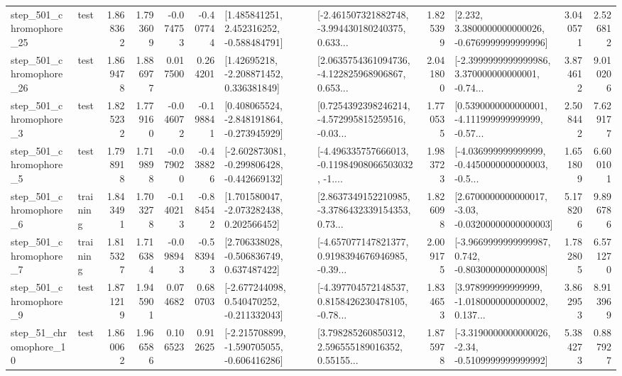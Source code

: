 \begin{tabular}{llrrrrllrlrr}
  step\_501\_chromophore\_25 &      test &      1.868362 &    1.793609 &     -0.074753 & -0.407744 &    [1.485841251, 2.452316252, -0.588484791] &  [-2.461507321882748, -3.994430180240375, 0.633... &       1.825399 &   [2.232, 3.3800000000000026, -0.6769999999999996] &            3.040571 &          2.526812 \\
  step\_501\_chromophore\_26 &      test &      1.869478 &    1.886977 &      0.017500 &  0.264201 &     [1.42695218, -2.208871452, 0.336381849] &  [2.0635754361094736, -4.122825968906867, 0.653... &       2.041800 &  [-2.3999999999999986, 3.370000000000001, -0.74... &            3.874612 &          9.010206 \\
   step\_501\_chromophore\_3 &      test &      1.825232 &    1.779160 &     -0.046072 & -0.198841 &   [0.408065524, -2.848191864, -0.273945929] &  [0.7254392398246214, -4.572995815259516, -0.03... &       1.770535 &  [0.5390000000000001, -4.111999999999999, -0.57... &            2.508442 &          7.629177 \\
   step\_501\_chromophore\_5 &      test &      1.798918 &    1.719898 &     -0.079020 & -0.438826 &  [-2.602873081, -0.299806428, -0.442669132] &  [-4.496335757666013, -0.11984908066503032, -1.... &       1.983723 &  [-4.036999999999999, -0.4450000000000003, -0.5... &            1.651809 &          6.600101 \\
   step\_501\_chromophore\_6 &  training &      1.843491 &    1.703278 &     -0.140213 & -0.884542 &    [1.701580047, -2.073282438, 0.202566452] &  [2.8637349152210985, -3.3786432339154353, 0.73... &       1.826098 &  [2.6700000000000017, -3.03, -0.03200000000000003] &            5.178206 &          9.896786 \\
   step\_501\_chromophore\_7 &  training &      1.815327 &    1.716384 &     -0.098943 & -0.583943 &    [2.706338028, -0.506836749, 0.637487422] &  [-4.657077147821377, 0.9198394676946985, -0.39... &       2.009175 &  [-3.9669999999999987, 0.742, -0.8030000000000008] &            1.782805 &          6.571270 \\
   step\_501\_chromophore\_9 &      test &      1.871219 &    1.945901 &      0.074682 &  0.680703 &   [-2.677244098, 0.540470252, -0.211332043] &  [-4.397704572148537, 0.8158426230478105, -0.78... &       1.834653 &  [3.978999999999999, -1.0180000000000002, 0.137... &            3.862953 &          8.913969 \\
   step\_51\_chromophore\_10 &      test &      1.860062 &    1.966586 &      0.106523 &  0.912625 &  [-2.215708899, -1.590705055, -0.606416286] &  [3.798285260850312, 2.596555189016352, 0.55155... &       1.875978 &  [-3.3190000000000026, -2.34, -0.5109999999999992] &            5.384273 &          0.887927 \\

\end{tabular}
